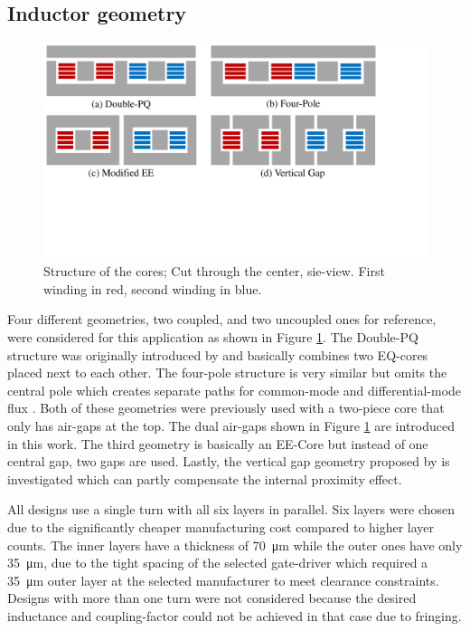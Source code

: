 \documentclass{IPEC2026}
\begin{document}
\subsection{Inductor geometry}
\begin{figure}
  \includegraphics[page=1, trim = 0cm 7cm 4.5cm 0cm, clip, width=\columnwidth]{figures/IPEC_Figures_PowerPoint.pdf}
  \caption{Structure of the cores; Cut through the center, sie-view. First winding in red, second winding in blue.}
  \label{fig:Core_Drawings}
\end{figure}
Four different geometries, two coupled, and two uncoupled ones for reference, were considered for this application as shown in Figure \ref{fig:Core_Drawings}. The Double-PQ structure was originally introduced by \cite{wangPCBWindingBasedCoupled2023} and basically combines two EQ-cores placed next to each other. The four-pole structure is very similar but omits the central pole which creates separate paths for common-mode and differential-mode flux \cite{huaUltrathinCoupledInductor2021}. Both of these geometries were previously used with a two-piece core that only has air-gaps at the top. The dual air-gaps shown in Figure \ref{fig:Core_Drawings} are introduced in this work. The third geometry is basically an EE-Core but instead of one central gap, two gaps are used. Lastly, the vertical gap geometry proposed by \cite{schaferNovelHighlyEfficient2020} is investigated which can partly compensate the internal proximity effect. %
\par All designs use a single turn with all six layers in parallel. Six layers were chosen due to the significantly cheaper manufacturing cost compared to higher layer counts. The inner layers have a thickness of \qty{70}{\um} while the outer ones have only \qty{35}{\um}, due to the tight spacing of the selected gate-driver which required a \qty{35}{\um} outer layer at the selected manufacturer to meet clearance constraints. Designs with more than one turn were not considered because the desired inductance and coupling-factor could not be achieved in that case due to fringing.
\end{document}
